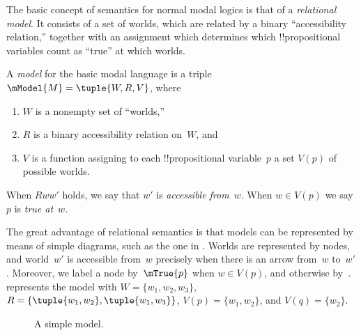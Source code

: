 \documentclass[../../../include/open-logic-section]{subfiles}
\begin{document}


The basic concept of semantics for normal modal logics is that of a
\emph{relational model}. It consists of a set of worlds, which are
related by a binary ``accessibility relation,'' together with an
assignment which determines which !!{propositional variable}s count as
``true'' at which worlds.

\begin{defn}
  A \emph{model} for the basic modal language is a triple $\mModel{M}
  = \tuple{W, R, V}$, where
  \begin{enumerate}
  \item $W$ is a nonempty set of ``worlds,''
  \item $R$ is a binary accessibility relation on~$W$, and
  \item $V$ is a function assigning to each !!{propositional
    variable}~$p$ a set $V(p)$ of possible worlds.
  \end{enumerate}
  When $Rww'$ holds, we say that $w'$ is \emph{accessible
    from}~$w$. When $w \in V(p)$ we say $p$ is \emph{true at}~$w$.
\end{defn}

The great advantage of relational semantics is that models can be
represented by means of simple diagrams, such as the one in
. Worlds are represented by nodes, and world~$w'$ is
accessible from~$w$ precisely when there is an arrow from~$w$
to~$w'$. Moreover, we label a node by~$\mTrue{p}$ when $w \in V(p)$,
and otherwise by~.  represents the model
with $W = \{w_1, w_2, w_3\}$, $R = \{\tuple{w_1, w_2},\tuple{w_1,
  w_3}\}$, $V(p) = \{w_1, w_2\}$, and $V(q) = \{w_2\}$.

\begin{figure}
  \begin{center}
  \end{center}
\caption{A simple model.}
\end{figure}
\end{document}
